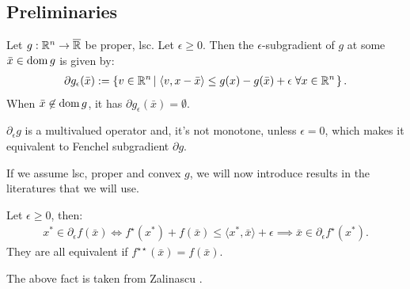 \documentclass[12pt]{article}
\begin{document}
    \subsection{Preliminaries}
        \begin{definition}\label{def:esp-subgrad}
            Let $g: \mathbb R^n \rightarrow \overline {\mathbb R}$ be proper, lsc. 
            Let $\epsilon \ge 0$. 
            Then the $\epsilon$-subgradient of $g$ at some $\bar x \in \operatorname{dom} g$ is given by: 
            $$
            \begin{aligned}
                \partial g_\epsilon(\bar  x) := 
                \left\lbrace
                    v \in \mathbb R^n \left| \; 
                        \langle v, x - \bar  x\rangle \le 
                        g(x) - g(\bar x) + \epsilon \;\forall x \in \mathbb R^n
                    \right. 
                \right\rbrace.
            \end{aligned}
            $$
            When $\bar x \not \in \operatorname{dom} g$, it has $\partial g_\epsilon(\bar x) = \emptyset$. 
        \end{definition}
        \begin{remark}
            $\partial_\epsilon g$ is a multivalued operator and, it's not monotone, unless $\epsilon = 0$, which makes it equivalent to Fenchel subgradient $\partial g$. 
        \end{remark}
        If we assume lsc, proper and convex $g$, we will now introduce results in the literatures that we will use. 
        \begin{fact}\label{fact:esp-fenchel-ineq}
            Let $\epsilon \ge 0$, then:
            \begin{align*}
                x^* \in \partial_\epsilon f(\bar x)\iff f^\star(x^*) + f(\bar x) \le \langle x^*, \bar x\rangle + \epsilon \implies \bar x \in \partial_\epsilon f^\star(x^*).
            \end{align*}
            They are all equivalent if $f^{\star\star}(\bar x) = f(\bar x)$. 
        \end{fact}
        \begin{remark}
            The above fact is taken from Zalinascu \cite[Theorem 2.4.2]{zalinescu_convex_2002}. 
        \end{remark}
\end{document}
